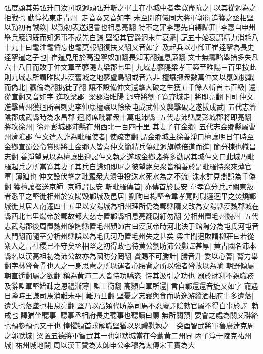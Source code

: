 弘度顧其弟弘升曰汝可取迥頭弘升斬之軍士在小城中者孝寛盡阬之|{
	以其從迥為之拒戰也}
勤惇祐東走青州|{
	走音奏又音如字}
未至開府儀同大將軍郭衍追獲之丞相堅以勤初有誠欵|{
	以勤初表送迥書也相息亮翻}
特不之罪李惠先自縛歸罪|{
	李惠自申州舉兵應迥既而知迥事不成先自歸}
堅復其官爵迥末年衰耄|{
	記五十始衰謂精力消耗八十九十曰耄注耄惛忘也耄莫報翻復扶又翻又音如字}
及起兵以小御正崔逹挐為長史逹挐暹之子也|{
	崔暹見用於高澄挐奴加翻長知兩翻暹息廉翻}
文士無籌略舉措多失凡六十八日而敗于仲文軍至蓼隄去梁郡七里|{
	九域志蓼隄梁孝王築至睢陽三百里按此則九域志所謂睢陽非漢舊城之地蓼盧鳥翻或音六非}
檀讓擁衆數萬仲文以羸師挑戰而偽北|{
	羸倫為翻挑徒了翻}
讓不設備仲文還擊大破之生獲五千餘人斬首七百級|{
	還從宣翻又音如字}
進攻梁郡|{
	梁郡治睢陽}
迥守將劉子寛弃城走|{
	將即亮翻下同}
仲文進擊曹州獲迥所署刺史李仲康檀讓以餘衆屯成武仲文襲擊破之遂拔成武|{
	五代志濟隂郡成武縣時為永昌郡}
迥將席毗羅衆十萬屯沛縣|{
	五代志沛縣屬彭城郡將即亮翻}
將攻徐州|{
	徐州彭城郡沛縣在州西北一百四十里}
其妻子在金鄉|{
	五代志金鄉縣屬曹州濟隂郡}
仲文遣人詐為毗羅使者|{
	使疏吏翻}
謂金鄉城主徐善淨曰檀讓明日午時至金鄉宣蜀公令賞賜將士金鄉人皆喜仲文簡精兵偽建迥旗幟倍道而進|{
	簡分揀也幟昌志翻}
善淨望見以為檀讓出迎謁仲文執之遂取金鄉諸將多勸屠其城仲文曰此城乃毗羅起兵之所當寛其妻子其兵自歸如即屠之彼望絶矣衆皆稱善於是毗羅恃衆來薄官軍|{
	薄廹也}
仲文設伏擊之毗羅衆大潰爭投洙水死水為之不流|{
	洙水詳見辯誤為千偽翻}
獲檀讓檻送京師|{
	京師謂長安}
斬毗羅傳首|{
	亦傳首於長安}
韋孝寛分兵討關東叛者悉平之堅徙相州於安陽毁鄴城及邑居|{
	劉昫曰楊堅令韋孝寛討尉遲迥平之焚燒鄴城徙其居人南遷四十五里以安陽城為相州理所仍為鄴縣隋又改為安陽縣漢魏郡城在縣西北七里煬帝於鄴故都大慈寺置鄴縣相息亮翻尉紆勿翻}
分相州置毛州魏州|{
	五代志武陽郡後周置魏州館陶縣置毛州顔師古曰漢武帝時河北決于館陶分為屯氏河屯音大門翻而隨室分析州縣誤以為毛氏河乃置毛州失之甚矣}
梁主聞迥敗謂柳莊曰若從衆人之言社稷已不守矣丞相堅之初得政也待黄公劉昉沛公鄭譯甚厚|{
	黄古國名沛本縣名以漢高祖初為沛公故亦為國昉分罔翻}
賞賜不可勝計|{
	勝音升}
委以心膂|{
	膂力舉翻字林膂脊骨也人之一身思慮之所以運者心腰背之所以強者膂故以為喻}
朝野傾屬|{
	朝直遥翻屬之欲翻}
稱為黄沛二人皆恃功驕恣|{
	恃其汲引之功也}
溺於財利不親職務及辭監軍堅始疎之恩禮漸薄|{
	監工銜翻}
高熲自軍所還|{
	言自鄴還還音旋又如字}
寵遇日隆時王謙司馬消難未平|{
	難乃旦翻}
堅憂之忘寢與食而昉逸游縱酒相府事多遺落|{
	遺失也落墜也相息亮翻}
堅乃以高熲代昉為司馬不忍廢譯隂勑官屬不得白事於譯|{
	勑戒也}
譯猶坐聽事|{
	聽事丞相府長史聽事也聽讀曰廳}
無所關預|{
	要會之處為關又聨絡也預參預也又干也}
惶懼頓首求解職堅猶以恩禮慰勉之　癸酉智武將軍魯廣逹克周之郭默城|{
	梁置五德將軍智武其一也郭默城當在今蘄黄二州界}
丙子淳于陵克祐州城|{
	祐州城地闕}
周以漢王贊為太師申公李穆為太傅宋王實為大

